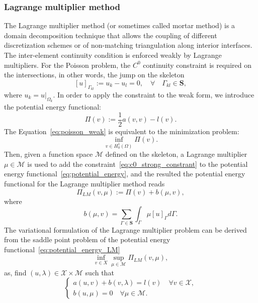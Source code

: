 \documentclass[preprint,12pt]{elsarticle}
\theoremstyle{remark}
\begin{document}
\subsubsection{Lagrange multiplier method}
The Lagrange multiplier method (or sometimes called mortar method) is a domain decomposition technique that allows the coupling of different discretization schemes or of non-matching triangulation along interior interfaces. The inter-element continuity condition is enforced weakly by Lagrange multipliers. For the Poisson problem, the $C^0$ continuity constraint is required on the intersections, in other words, the jump on the skeleton
\begin{equation}
    \left[u\right]_{\Gamma_{kl}}:=u_k-u_l=0, \quad \forall \quad\Gamma_{kl}\in\mathbf{S},\label{eq:c0_strong_constrant}
\end{equation}
where $u_k=u\vert_{\Omega_k}$. In order to apply the constraint to the weak form, we introduce the potential energy functional:
\begin{equation}
    \Pi(v):=\frac{1}{2}a(v,v)-l(v).\label{eq:potential_energy}
\end{equation} 
The Equation~\eqref{eq:poisson_weak} is equivalent to the minimization problem:
\begin{equation}
    \inf_{v\in{H^1_0(\Omega)}}\Pi(v).
\end{equation}
Then, given a function space $\mathcal{M}$ defined on the skeleton, a Lagrange multiplier $\mu\in{\mathcal{M}}$ is used to add the constraint~\eqref{eq:c0_strong_constrant} to the potential energy functional~\eqref{eq:potential_energy}, and the resulted the potential energy functional for the Lagrange multiplier method reads
\begin{equation}
    \Pi_{LM}(v,\mu):=\Pi(v)+b(\mu,v),\label{eq:potential_energy_LM}
\end{equation}
where
\begin{equation}
    b(\mu,v)=\sum_{\Gamma\in\mathbf{S}}\int_\Gamma\mu\left[u\right]_{\Gamma}d\Gamma.
\end{equation}
The variational formulation of the Lagrange multiplier problem can be derived from the saddle point problem of the potential energy functional~\eqref{eq:potential_energy_LM}
\begin{equation}
    \inf_{v\in{X}}\sup_{\mu\in{\mathcal{M}}}\Pi_{LM}(v,\mu),
\end{equation}
as, find $(u,\lambda)\in{\mathcal{X}}\times{\mathcal{M}}$ such that
\begin{equation}
    \left\{
    \begin{array}{ll}
        a(u,v)+b(v,\lambda)=l(v) \quad \forall v\in{\mathcal{X}},\\
        b(u,\mu)=0 \quad \forall \mu\in{\mathcal{M}}.\label{eq:mixed_form}
    \end{array}
    \right.
\end{equation}
\end{document}
